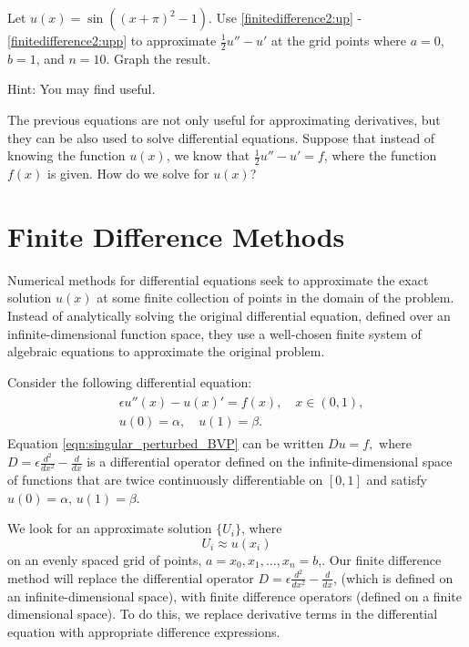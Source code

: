 \begin{problem}
	Let $u(x) = \sin((x+\pi)^2-1)$.
	Use \eqref{finitedifference2:up} - \eqref{finitedifference2:upp} to approximate $\frac{1}{2}u'' - u'$ at the grid points where $a=0$, $b=1$, and $n=10$.
	Graph the result.
    
    Hint: You may find  useful.
\end{problem}

The previous equations are not only useful for approximating derivatives, but they can be also used to solve differential equations.
Suppose that instead of knowing the function $u(x)$, we know that $\frac{1}{2}u'' - u' = f$, where the function $f(x)$ is given.
How do we solve for $u(x)$?

\section*{Finite Difference Methods}

Numerical methods for differential equations seek to approximate the exact solution $u(x)$ at some finite collection of points in the domain of the problem.
Instead of analytically solving the original differential equation, defined over an infinite-dimensional function space, they use a well-chosen finite system of algebraic equations to approximate the original problem.

Consider the following differential equation:
\begin{align}
	\begin{split}
	&{ } \epsilon u''(x)-u(x)'= f(x), \quad x \in (0,1), \\
	&{ } u(0) = \alpha, \quad u(1) = \beta.
	\end{split} \label{eqn:singular_perturbed_BVP}
\end{align}
Equation \eqref{eqn:singular_perturbed_BVP} can be written $D u = f,$ where $D = \epsilon \frac{d^2}{dx^2} - \frac{d}{dx}$ is a differential operator defined on the infinite-dimensional space of functions that are twice continuously differentiable on $[0,1]$ and satisfy $u(0) = \alpha$, $u(1) = \beta$.

We look for an approximate solution $\{U_i\}$, where \[U_i \approx u(x_i)\] on an evenly spaced grid of points, $a = x_0, x_1, \ldots, x_n = b$,.
Our finite difference method will replace the differential operator $D = \epsilon \frac{d^2}{dx^2} - \frac{d}{dx}$, (which is defined on an infinite-dimensional space), with finite difference operators (defined on a finite dimensional space).
To do this, we replace derivative terms in the differential equation with appropriate difference expressions.

